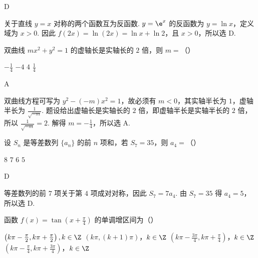 \begin{answer}
D
\end{answer}

\begin{solution}
关于直线 \(y=x\) 对称的两个函数互为反函数. \(y=\e^{x}\) 的反函数为 \(y=\ln x\)，定义域为 \(x>0\). 因此 \(f(2x)=\ln(2x)=\ln x+\ln2\)，且 \(x>0\)，所以选 D.
\end{solution}

\begin{problem}
双曲线 \(mx^{2} + y^{2} = 1\) 的虚轴长是实轴长的 \(2\) 倍，则 \(m =\)（\quad）

\choices
    {\(-\frac{1}{4}\)}
    {\(-4\)}
    {\(4\)}
    {\(\frac{1}{4}\)}
\end{problem}

\begin{answer}
A
\end{answer}

\begin{solution}
双曲线方程可写为 \(y^{2}-(-m)x^{2}=1\)，故必须有 \(m<0\)，其实轴半长为 \(1\)，虚轴半长为 \(\frac{1}{\sqrt{-m}}\). 题设给出虚轴长是实轴长的 \(2\) 倍，即虚轴半长是实轴半长的 \(2\) 倍，所以 \(\frac{1}{\sqrt{-m}}=2\). 解得 \(m=-\frac{1}{4}\)，所以选 A.
\end{solution}

\begin{problem}
设 \(S_{n}\) 是等差数列 \(\{a_{n}\}\) 的前 \(n\) 项和，若 \(S_{7} = 35\)，则 \(a_{4} =\)（\quad）

\choices
    {\(8\)}
    {\(7\)}
    {\(6\)}
    {\(5\)}
\end{problem}

\begin{answer}
D
\end{answer}

\begin{solution}
等差数列的前 \(7\) 项关于第 \(4\) 项成对对称，因此 \(S_{7}=7a_{4}\). 由 \(S_{7}=35\) 得 \(a_{4}=5\)，所以选 D.
\end{solution}

\begin{problem}
函数 \( f(x) = \tan \left(x + \frac{\pi}{4}\right) \) 的单调增区间为（\quad）

\choices
    {\(\left(k\pi -\frac{\pi}{2},k\pi +\frac{\pi}{2}\right),k\in \Z\)}
    {\((k\pi ,(k + 1)\pi)\)，\(k\in \Z\)}
    {\(\left(k\pi -\frac{3\pi}{4},k\pi +\frac{\pi}{4}\right)\)，\(k\in \Z\)}
    {\(\left(k\pi -\frac{\pi}{4},k\pi +\frac{3\pi}{4}\right)\)，\(k\in \Z\)}
\end{problem}

